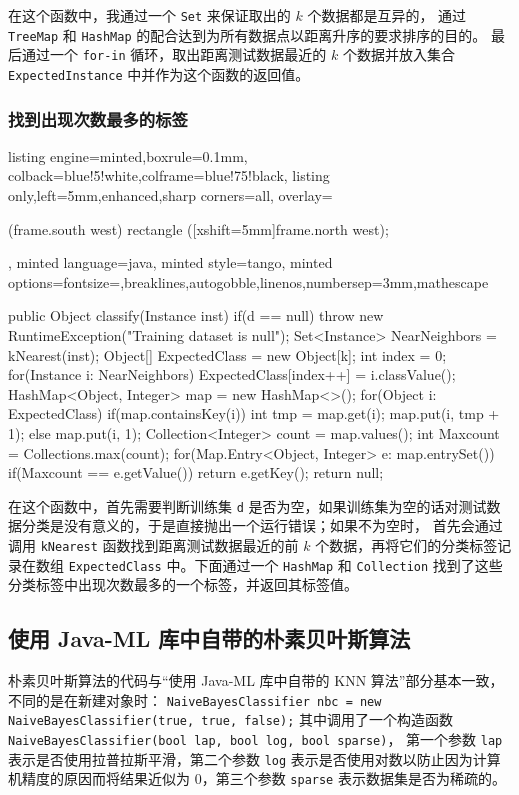 \documentclass[a4paper, 11pt, cn]{elegantpaper}
\begin{document}
在这个函数中，我通过一个 \texttt{Set} 来保证取出的 $k$ 个数据都是互异的，
通过 \texttt{TreeMap} 和 \texttt{HashMap} 的配合达到为所有数据点以距离升序的要求排序的目的。
最后通过一个 \texttt{for-in} 循环，取出距离测试数据最近的 $k$ 个数据并放入集合 \texttt{ExpectedInstance} 中并作为这个函数的返回值。

\subsubsection{找到出现次数最多的标签}
\begin{tcblisting}{listing engine=minted,boxrule=0.1mm,
    colback=blue!5!white,colframe=blue!75!black,
    listing only,left=5mm,enhanced,sharp corners=all,
    overlay={\begin{tcbclipinterior} (frame.south west)
    rectangle ([xshift=5mm]frame.north west);\end{tcbclipinterior}},
    minted language=java,
    minted style=tango,
    minted options={fontsize=\small,breaklines,autogobble,linenos,numbersep=3mm,mathescape}}
public Object classify(Instance inst)
{
	if(d == null)
		throw new RuntimeException("Training dataset is null");
	Set<Instance> NearNeighbors = kNearest(inst);
	Object[] ExpectedClass = new Object[k];
	int index = 0;
	for(Instance i: NearNeighbors)
		ExpectedClass[index++] = i.classValue();
	HashMap<Object, Integer> map = new HashMap<>();
	for(Object i: ExpectedClass)
	{
		if(map.containsKey(i))
		{
			int tmp = map.get(i);
			map.put(i, tmp + 1);
		}
		else
			map.put(i, 1);
	}
	Collection<Integer> count = map.values();
	int Maxcount = Collections.max(count);
	for(Map.Entry<Object, Integer> e: map.entrySet())
		if(Maxcount == e.getValue())
			return e.getKey();
	return null;
}
\end{tcblisting}

在这个函数中，首先需要判断训练集 \texttt{d} 是否为空，如果训练集为空的话对测试数据分类是没有意义的，于是直接抛出一个运行错误；如果不为空时，
首先会通过调用 \texttt{kNearest} 函数找到距离测试数据最近的前 $k$ 个数据，再将它们的分类标签记录在数组 \texttt{ExpectedClass} 中。下面通过一个 \texttt{HashMap} 和 \texttt{Collection}
 找到了这些分类标签中出现次数最多的一个标签，并返回其标签值。

\subsection{使用 Java-ML 库中自带的朴素贝叶斯算法}

朴素贝叶斯算法的代码与“使用 Java-ML 库中自带的 KNN 算法”部分基本一致，不同的是在新建对象时：
\texttt{NaiveBayesClassifier nbc = new NaiveBayesClassifier(true, true, false);} 其中调用了一个构造函数 \texttt{NaiveBayesClassifier(bool lap, bool log, bool sparse)}，
第一个参数 \texttt{lap} 表示是否使用拉普拉斯平滑，第二个参数 \texttt{log} 表示是否使用对数以防止因为计算机精度的原因而将结果近似为 0，第三个参数 \texttt{sparse} 表示数据集是否为稀疏的。
\end{document}
